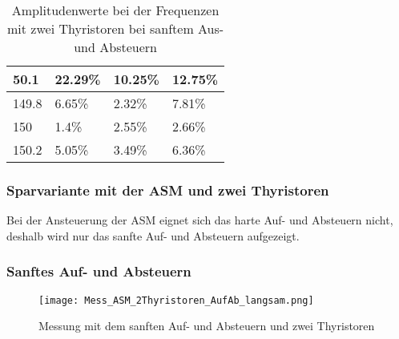 \begin{table}[ht!]
\begin{tabular}{|l|l|l|l|}
		50.1              & 22.29\%                                                                             & 10.25\%                                                                             & 12.75\%                                                                             \\ \hline
		149.8             & 6.65\%                                                                              & 2.32\%                                                                              & 7.81\%                                                                              \\ \hline
		150               & 1.4\%                                                                               & 2.55\%                                                                              & 2.66\%                                                                              \\ \hline
		150.2             & 5.05\%                                                                              & 3.49\%                                                                              & 6.36\%                                                                              \\ \hline
	\end{tabular}
\caption{Amplitudenwerte bei der Frequenzen mit zwei Thyristoren bei sanftem Aus- und Absteuern}\label{tab:Mess_2Thyristoren_Spannung_Widerstand_AufAb_sanft}
\end{table}
\newpage


\subsubsection{Sparvariante mit der ASM und zwei Thyristoren}
Bei der Ansteuerung der ASM eignet sich das harte Auf- und Absteuern nicht, deshalb wird nur das sanfte Auf- und Absteuern aufgezeigt.
\subsubsection*{Sanftes Auf- und Absteuern}
\begin{figure}[ht!]
	\centering
	\texttt{[image: Mess\_ASM\_2Thyristoren\_AufAb\_langsam.png]}	
	\caption{Messung mit dem sanften Auf- und Absteuern und zwei Thyristoren}\label{Mess_2Thyristoren_ASM_AufAbFahren_langsam}	
\end{figure}


